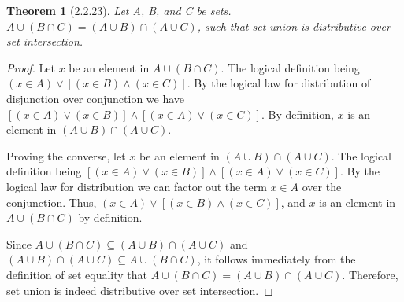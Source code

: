 \documentclass[a4paper, 12pt]{article}
\theoremstyle{plain}
\newtheorem*{theorem*}{Theorem}
\begin{document}
	
	\begin{theorem*}[2.2.23]
		Let A, B, and C be sets. $A \cup (B \cap C) = (A \cup B) \cap (A \cup C)$, such that set 
		union is distributive over set intersection.
	\end{theorem*}
	
	\begin{proof}
		Let $x$ be an element in $A \cup (B \cap C)$. The logical definition being \newline 
		$(x \in A) \lor [(x \in B) \land (x \in C)]$. By the logical law for distribution of 
		disjunction over conjunction we have 
		$[(x \in A) \lor (x \in B)] \land [(x \in A) \lor (x \in C)]$. By definition, $x$ is an 
		element in $(A \cup B) \cap (A \cup C)$.
		
		Proving the converse, let $x$ be an element in $(A \cup B) \cap (A \cup C)$. The logical 
		definition being $[(x \in A) \lor (x \in B)] \land [(x \in A) \lor (x \in C)]$. By the 
		logical law for distribution we can factor out the term $x \in A$ over the conjunction. 
		Thus, $(x \in A) \lor [(x \in B) \land (x \in C)]$, and $x$ is an element in 
		$A \cup (B \cap C)$ by definition.
		
		Since $A \cup (B \cap C) \subseteq (A \cup B) \cap (A \cup C)$ and \newline 
		$(A \cup B) \cap (A \cup C) \subseteq A \cup (B \cap C)$, it follows immediately from the 
		definition of set equality that $A \cup (B \cap C) = (A \cup B) \cap (A \cup C)$. Therefore, 
		set union is indeed distributive over set intersection.
	\end{proof}
\end{document}
